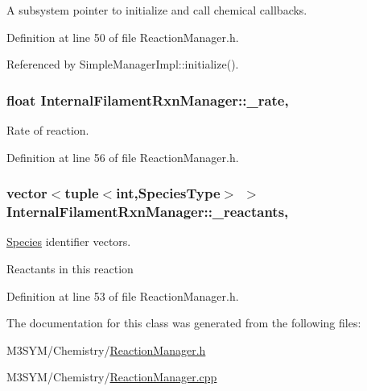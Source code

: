 A subsystem pointer to initialize and call chemical callbacks. 



Definition at line 50 of file Reaction\+Manager.\+h.



Referenced by Simple\+Manager\+Impl\+::initialize().

\hypertarget{classInternalFilamentRxnManager_a8b98dd9e6f5d016149f5434b891806df}{
\subsubsection[{\+\_\+rate}]{\setlength{\rightskip}{0pt plus 5cm}float Internal\+Filament\+Rxn\+Manager\+::\+\_\+rate\hspace{0.3cm}{\ttfamily [protected]}, {\ttfamily [inherited]}}}\label{classInternalFilamentRxnManager_a8b98dd9e6f5d016149f5434b891806df}


Rate of reaction. 



Definition at line 56 of file Reaction\+Manager.\+h.

\hypertarget{classInternalFilamentRxnManager_a63de9061c3da4ad03cf4c530d2774979}{
\subsubsection[{\+\_\+reactants}]{\setlength{\rightskip}{0pt plus 5cm}vector$<$tuple$<$int,{\bf Species\+Type}$>$ $>$ Internal\+Filament\+Rxn\+Manager\+::\+\_\+reactants\hspace{0.3cm}{\ttfamily [protected]}, {\ttfamily [inherited]}}}\label{classInternalFilamentRxnManager_a63de9061c3da4ad03cf4c530d2774979}


\hyperlink{classSpecies}{Species} identifier vectors. 

Reactants in this reaction 

Definition at line 53 of file Reaction\+Manager.\+h.



The documentation for this class was generated from the following files\+:\begin{DoxyCompactItemize}
\item 
M3\+S\+Y\+M/\+Chemistry/\hyperlink{ReactionManager_8h}{Reaction\+Manager.\+h}\item 
M3\+S\+Y\+M/\+Chemistry/\hyperlink{ReactionManager_8cpp}{Reaction\+Manager.\+cpp}\end{DoxyCompactItemize}
